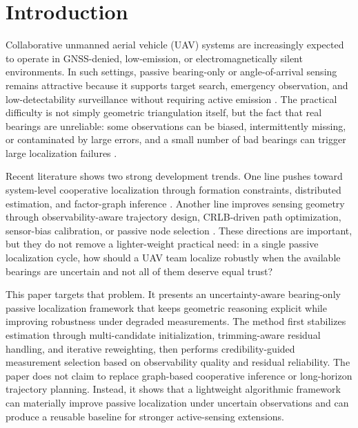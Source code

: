\documentclass[preprint,12pt]{elsarticle}
\begin{document}
\section{Introduction}

Collaborative unmanned aerial vehicle (UAV) systems are increasingly expected to operate in GNSS-denied, low-emission, or electromagnetically silent environments. In such settings, passive bearing-only or angle-of-arrival sensing remains attractive because it supports target search, emergency observation, and low-detectability surveillance without requiring active emission \cite{kramaric2025comprehensive,liu2025survey,avola2024uav}. The practical difficulty is not simply geometric triangulation itself, but the fact that real bearings are unreliable: some observations can be biased, intermittently missing, or contaminated by large errors, and a small number of bad bearings can trigger large localization failures \cite{wang2025bio,chen2025error,li2025bearing}.

Recent literature shows two strong development trends. One line pushes toward system-level cooperative localization through formation constraints, distributed estimation, and factor-graph inference \cite{li2026formation,yang2024distributed}. Another line improves sensing geometry through observability-aware trajectory design, CRLB-driven path optimization, sensor-bias calibration, or passive node selection \cite{peng2024trajectory,he2019trajectory,chen2025variable,wang2025bio,xing2025node}. These directions are important, but they do not remove a lighter-weight practical need: in a single passive localization cycle, how should a UAV team localize robustly when the available bearings are uncertain and not all of them deserve equal trust?

This paper targets that problem. It presents an uncertainty-aware bearing-only passive localization framework that keeps geometric reasoning explicit while improving robustness under degraded measurements. The method first stabilizes estimation through multi-candidate initialization, trimming-aware residual handling, and iterative reweighting, then performs credibility-guided measurement selection based on observability quality and residual reliability. The paper does not claim to replace graph-based cooperative inference or long-horizon trajectory planning. Instead, it shows that a lightweight algorithmic framework can materially improve passive localization under uncertain observations and can produce a reusable baseline for stronger active-sensing extensions.
\end{document}
